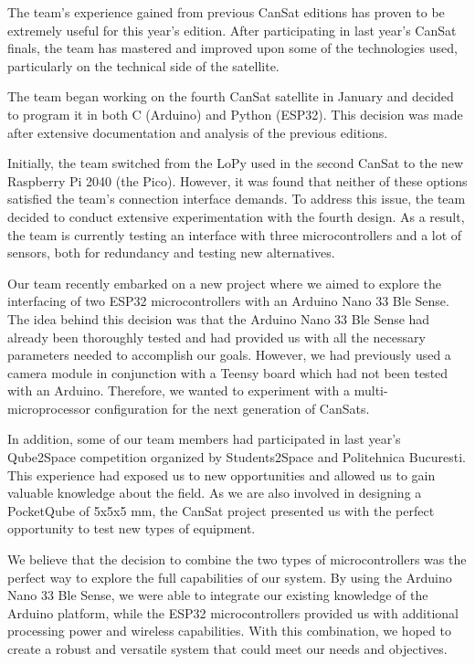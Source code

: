 \documentclass[11pt]{article}
\begin{document}
The team's experience gained from previous CanSat editions has proven to be extremely useful for this year's edition. After participating in last year's CanSat finals, the team has mastered and improved upon some of the technologies used, particularly on the technical side of the satellite.

The team began working on the fourth CanSat satellite in January and decided to program it in both C (Arduino) and Python (ESP32). This decision was made after extensive documentation and analysis of the previous editions.

Initially, the team switched from the LoPy used in the second CanSat to the new Raspberry Pi 2040 (the Pico). However, it was found that neither of these options satisfied the team's connection interface demands. To address this issue, the team decided to conduct extensive experimentation with the fourth design. As a result, the team is currently testing an interface with three microcontrollers and a lot of sensors, both for redundancy and testing new alternatives.

Our team recently embarked on a new project where we aimed to explore the interfacing of two ESP32 microcontrollers with an Arduino Nano 33 Ble Sense. The idea behind this decision was that the Arduino Nano 33 Ble Sense had already been thoroughly tested and had provided us with all the necessary parameters needed to accomplish our goals. However, we had previously used a camera module in conjunction with a Teensy board which had not been tested with an Arduino. Therefore, we wanted to experiment with a multi-microprocessor configuration for the next generation of CanSats.

In addition, some of our team members had participated in last year's Qube2Space competition organized by Students2Space and Politehnica Bucuresti. This experience had exposed us to new opportunities and allowed us to gain valuable knowledge about the field. As we are also involved in designing a PocketQube of 5x5x5 mm, the CanSat project presented us with the perfect opportunity to test new types of equipment.

We believe that the decision to combine the two types of microcontrollers was the perfect way to explore the full capabilities of our system. By using the Arduino Nano 33 Ble Sense, we were able to integrate our existing knowledge of the Arduino platform, while the ESP32 microcontrollers provided us with additional processing power and wireless capabilities. With this combination, we hoped to create a robust and versatile system that could meet our needs and objectives.
\end{document}
